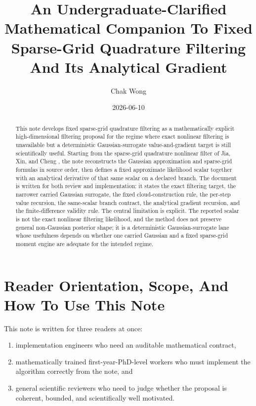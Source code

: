 \documentclass[11pt]{article}
\title{An Undergraduate-Clarified Mathematical Companion To Fixed Sparse-Grid Quadrature Filtering And Its Analytical Gradient}
\author{Chak Wong}
\date{2026-06-10}
\numberwithin{equation}{section}
\begin{document}
\maketitle

\begin{abstract}
This note develops fixed sparse-grid quadrature filtering as a
mathematically explicit high-dimensional filtering proposal for the regime where
exact nonlinear filtering is unavailable but a deterministic Gaussian-surrogate
value-and-gradient target is still scientifically useful.  Starting from the
sparse-grid quadrature nonlinear filter of Jia, Xin, and Cheng
\cite{jia2012sparsegrid}, the note reconstructs the Gaussian approximation and
sparse-grid formulas in source order, then defines a fixed approximate
likelihood scalar together with an analytical derivative of that same scalar on
a declared branch.  The document is written for both review and implementation:
it states the exact filtering target, the narrower carried Gaussian surrogate,
the fixed cloud-construction rule, the per-step value recursion, the
same-scalar branch contract, the analytical gradient recursion, and the
finite-difference validity rule.  The central limitation is explicit.  The
reported scalar is not the exact nonlinear filtering likelihood, and the method
does not preserve general non-Gaussian posterior shape; it is a deterministic
Gaussian-surrogate lane whose usefulness depends on whether one carried Gaussian
and a fixed sparse-grid moment engine are adequate for the intended regime.
\end{abstract}

\section{Reader Orientation, Scope, And How To Use This Note}
\label{sec:p33-reader-orientation}

This note is written for three readers at once:
\begin{enumerate}[leftmargin=0.28in]
  \item implementation engineers who need an auditable mathematical contract,
  \item mathematically trained first-year-PhD-level workers who must implement
  the algorithm correctly from the note, and
  \item general scientific reviewers who need to judge whether the proposal is
  coherent, bounded, and scientifically well motivated.
\end{enumerate}
\end{document}

